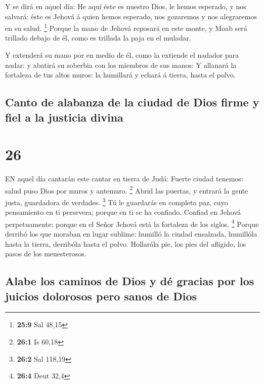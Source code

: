  Y se dirá en aquel día: He aquí éste es nuestro Dios, le
hemos esperado, y nos salvará: éste es Jehová á quien hemos esperado,
nos gozaremos y nos alegraremos en su salud. \footnote{\textbf{25:9} Sal
  48,15}  Porque la mano de Jehová reposará en este monte,
y Moab será trillado debajo de él, como es trillada la paja en el
muladar.

 Y extenderá su mano por en medio de él, como la extiende
el nadador para nadar: y abatirá su soberbia con los miembros de sus
manos:  Y allanará la fortaleza de tus altos muros: la
humillará y echará á tierra, hasta el polvo.

\hypertarget{canto-de-alabanza-de-la-ciudad-de-dios-firme-y-fiel-a-la-justicia-divina}{%
\subsection{Canto de alabanza de la ciudad de Dios firme y fiel a la
justicia
divina}\label{canto-de-alabanza-de-la-ciudad-de-dios-firme-y-fiel-a-la-justicia-divina}}

\hypertarget{section-25}{%
\section{26}\label{section-25}}

 EN aquel día cantarán este cantar en tierra de Judá: Fuerte
ciudad tenemos: salud puso Dios por muros y antemuro. \footnote{\textbf{26:1}
  Is 60,18}  Abrid las puertas, y entrará la gente justa,
guardadora de verdades. \footnote{\textbf{26:2} Sal 118,19} 
Tú le guardarás en completa paz, cuyo pensamiento en ti persevera;
porque en ti se ha confiado.  Confiad en Jehová
perpetuamente: porque en el Señor Jehová está la fortaleza de los
siglos. \footnote{\textbf{26:4} Deut 32,4}  Porque derribó
los que moraban en lugar sublime: humilló la ciudad ensalzada, humillóla
hasta la tierra, derribóla hasta el polvo.  Hollarála pie,
los pies del afligido, los pasos de los menesterosos.

\hypertarget{alabe-los-caminos-de-dios-y-duxe9-gracias-por-los-juicios-dolorosos-pero-sanos-de-dios}{%
\subsection{Alabe los caminos de Dios y dé gracias por los juicios
dolorosos pero sanos de
Dios}\label{alabe-los-caminos-de-dios-y-duxe9-gracias-por-los-juicios-dolorosos-pero-sanos-de-dios}}


